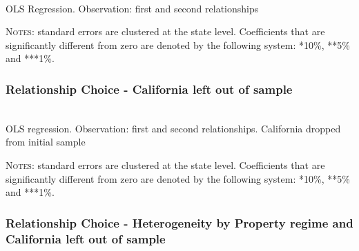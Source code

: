 \documentclass[12pt]{article}
\numberwithin{table}{section}
\begin{document}

	\begin{table}[H]\centering
	\caption{\\OLS Regression. Observation: first and second relationships}
	\label{table:wmarlinc}
	\begin{threeparttable}[t]\centering
	
	\begin{tablenotes}[flushleft]
	\footnotesize{\item \textsc{Notes}: standard errors are clustered at the state level.
		Coefficients that are significantly different from zero are denoted by the following system: *10\%, **5\%  and ***1\%.}
	\end{tablenotes}
	\end{threeparttable}
	\end{table}
\FloatBarrier

\FloatBarrier

\subsubsection*{Relationship Choice - California left out of sample}

\begin{table}[H]\centering
	\caption{\\OLS regression. Observation: first and second relationships. California dropped from initial sample}
	\label{table:wmar_c}
	\begin{threeparttable}[t]\centering
		
		\begin{tablenotes}[flushleft]
			\footnotesize{\item \textsc{Notes}: standard errors are clustered at the state level.
				Coefficients that are significantly different from zero are denoted by the following system: *10\%, **5\%  and ***1\%.}
		\end{tablenotes}
	\end{threeparttable}
\end{table}
\FloatBarrier

\subsubsection*{Relationship Choice - Heterogeneity by Property regime and California left out of sample}
\end{document}
